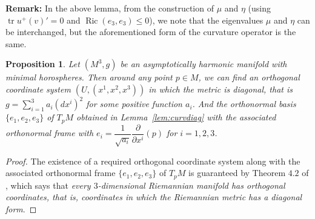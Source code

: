 \documentclass[12pt,a4paper]{amsart}
\newtheorem{Lem}[Thm]{Lemma}
\newtheorem{Pro}[Thm]{Proposition}
\theoremstyle{definition}
\theoremstyle{remark}
\newcommand{\la}{\lambda}
\newcommand{\Ric}{\operatorname{Ric}}
\newcommand{\tr}{\operatorname{tr}}
\newcommand \<{\langle}
\renewcommand \>{\rangle}
\begin{document}
\noindent
{{\bf Remark:} In the above lemma,  from the construction of $\mu$ and $\eta$ (using $\tr u^{+}(v)'=0$ and $\Ric(e_3,e_3)\le 0$), we note that the eigenvalues $\mu$
 and $\eta$ can be interchanged, but the aforementioned form of the curvature operator is the same.}




{
 \begin{Pro}
Let $(M^3, g)$ be an asymptotically harmonic manifold with minimal horospheres. Then
around  any point $p \in M$,  we can find an  orthogonal coordinate system $(U, (x^1, x^2, x^3))$
in which the metric is diagonal, that is $g=\sum\limits_{i=1}^{3}a_i(dx^{i})^2$ for some positive function $a_i$.
And the orthonormal basis  $\{e_1,e_2,e_3\}$ of $T_{p}M$ obtained in Lemma~\ref{lem:curvdiag}
with  the associated orthonormal frame with  $e_i = \dfrac{1}{\sqrt{a_i}}\dfrac{\partial}{\partial x^i} (p)$ for $i=1,2,3$.
\end{Pro}
\begin{proof}
The existence of a  required orthogonal coordinate system along with {the} associated orthonormal frame  $\{e_1,e_2,e_3\}$ of $T_{p}M$
is guaranteed  by Theorem $4.2$ of
\cite{DY}, which says that {\it every $3$-dimensional Riemannian manifold has orthogonal coordinates, that is, coordinates in which the Riemannian metric has a diagonal form}.
\end{proof}}
\end{document}
